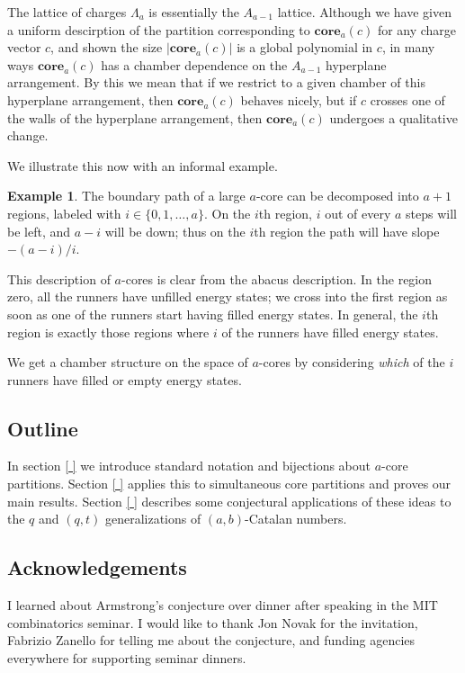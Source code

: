 \documentclass{amsart}[12pt]
\theoremstyle{definition}
\newtheorem{example}[dummy]{Example}
\newcommand{\core}{\mathbf{core}}
\begin{document}
The lattice of charges $\Lambda_a$ is essentially the $A_{a-1}$ lattice.  Although we have given a uniform descirption of the partition corresponding to $\core_a(c)$ for any charge vector $c$, and shown the size $|\core_a(c)|$ is a global polynomial in $c$, in many ways $\core_a(c)$ has a chamber dependence on the $A_{a-1}$ hyperplane arrangement.  By this we mean that if we restrict to a given chamber of this hyperplane arrangement, then $\core_a(c)$ behaves nicely, but if $c$ crosses one of the walls of the hyperplane arrangement, then $\core_a(c)$ undergoes a qualitative change.


We illustrate this now with an informal example.
\begin{example}
The boundary path of a large $a$-core can be decomposed into $a+1$ regions, labeled with $i\in\{0,1,\dots,a\}$.  On the $i$th region, $i$ out of every $a$ steps will be left, and $a-i$ will be down; thus on the $i$th region the path will have slope $-(a-i)/i$.  

This description of $a$-cores is clear from the abacus description.  In the region zero, all the runners have unfilled energy states; we cross into the first region as soon as one of the runners start having filled energy states.  In general, the $i$th region is exactly those regions where $i$ of the runners have filled energy states.  

We get a chamber structure on the space of $a$-cores by considering \emph{which} of the $i$ runners have filled or empty energy states.  



\end{example}




\subsection{Outline}
In section \ref{ } we introduce standard notation and bijections about $a$-core partitions.  Section \ref{ } applies this to simultaneous core partitions and proves our main results.  Section \ref{ } describes some conjectural applications of these ideas to the $q$ and $(q,t)$ generalizations of $(a,b)$-Catalan numbers.


\subsection{Acknowledgements}
I learned about Armstrong's conjecture over dinner after speaking in the MIT combinatorics seminar.  I would like to thank Jon Novak for the invitation, Fabrizio Zanello for telling me about the conjecture, and funding agencies everywhere for supporting seminar dinners.
\end{document}
